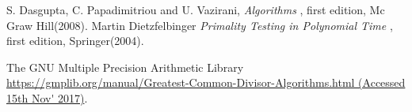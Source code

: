 \documentclass[12pt]{article}
\begin{document}
\begin{multicols}{2}
\begin{thebibliography}{6}

S. Dasgupta, C. Papadimitriou and U. Vazirani, \textsl{Algorithms
},
first edition, Mc Graw Hill(2008).
Martin Dietzfelbinger \textsl{Primality Testing in Polynomial Time
},
first edition, Springer(2004).

The GNU Multiple Precision Arithmetic Library \url{https://gmplib.org/manual/Greatest-Common-Divisor-Algorithms.html (Accessed 15th Nov' 2017)}.

\end{thebibliography}

\end{multicols}
\end{document}
